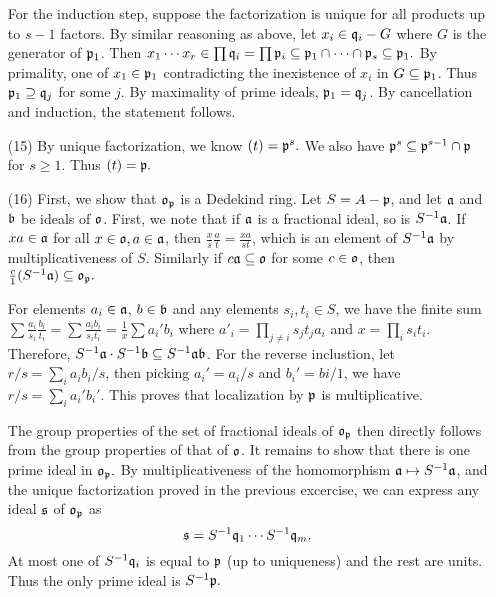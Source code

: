 \documentclass{article}
\theoremstyle{definition}
\theoremstyle{remark}
\begin{document}
\begin{enumerate}
        \newcommand{\inv}[1]{#1^{-1}}
        For the induction step, suppose the factorization is unique for all products up to $s - 1$ factors. By similar reasoning as above, let $x_i \in \mathfrak{q}_i - G$ where $G$ is the generator of $\mathfrak{p}_1$. Then $x_1 \cdots x_r \in \prod \mathfrak{q}_i =  \prod \mathfrak{p}_i \subseteq \mathfrak{p}_1 \cap \cdots \cap \mathfrak{p}_s \subseteq \mathfrak{p}_1.$ By primality, one of $x_1 \in \mathfrak{p}_1$ contradicting the inexistence of $x_i$ in $G \subseteq \mathfrak{p}_1$. Thus $\mathfrak{p}_1 \supseteq \mathfrak{q}_j$ for some $j$. By maximality of prime ideals, $\mathfrak{p}_1 = \mathfrak{q}_j$. By cancellation and induction, the statement follows.
  \item[(15)] By unique factorization, we know $(t)=  \mathfrak{p}^s.$ We also have $\mathfrak{p}^{s} \subseteq \mathfrak{p}^{s-1} \cap \mathfrak{p}$ for  $s \geq 1.$ Thus $(t) = \mathfrak{p}.$

\newcommand{\ploc}[1]{#1_{\ip}}
  \item[(16)] First, we show that $\ploc{\io}$ is a Dedekind ring. Let $S = A - \mathfrak{p}$, and let $\mathfrak{a}$ and $\mathfrak{b}$ be ideals of $\mathfrak{o}$. First, we note that if $\mathfrak{a}$ is a fractional ideal, so is ${S}^{-1}\mathfrak{a}$. If $xa \in \mathfrak{a}$ for all $x \in \mathfrak{o}, a \in \mathfrak{a}$, then $\frac{x}s \frac{a}t = \frac{xa}{st}$, which is an element of ${S}^{-1}\mathfrak{a}$ by multiplicativeness of $S$. Similarly if $c\mathfrak{a} \subseteq \mathfrak{o}$ for some $c \in \mathfrak{o}$, then $\frac{c}1 (\localize{S}{\I a}) \subseteq \ploc{\io}.$

        For elements $a_i \in \mathfrak{a}$, $b \in \mathfrak{b}$ and any elements $s_i, t_i \in S$, we have the finite sum $\sum \frac{a_i}{s_i}\frac{b_i}{t_i} = \sum \frac{a_ib_i}{s_it_i} = \frac{1}{x}\sum{a_i'b_i}$ where $a'_i = \prod_{j \neq i}s_jt_ja_i$  and $x = \prod_{i}s_it_i$. Therefore, ${S}^{-1}\mathfrak{a}\cdot {S}^{-1}\mathfrak{b} \subseteq {S}^{-1}\mathfrak{a}\mathfrak{b}$. For the reverse inclustion, let $r/s = \sum_i a_ib_i /s$, then picking $a_i' = a_i/s$ and $b_i' = bi/1$, we have $r/s = \sum_i a_i'b_i'$. This proves that localization by $\mathfrak{p}$ is multiplicative.

        The group properties of the set of fractional ideals of $\ploc{\io}$ then directly follows from the group properties of that of $\mathfrak{o}$. It remains to show that there is one prime ideal in $\ploc{\io}.$ By multiplicativeness of the homomorphism $\mathfrak{a} \mapsto {S}^{-1}\mathfrak{a}$, and the unique factorization proved in the previous excercise, we can express any ideal $\mathfrak{s}$ of $\ploc{\io}$ as
        $$\mathfrak{s} = {S}^{-1}\mathfrak{q}_1 \cdots {S}^{-1}\mathfrak{q}_m.$$
        At most one of ${S}^{-1}\mathfrak{q}_i$ is equal to $\mathfrak{p}$ (up to uniqueness) and the rest are units. Thus the only prime ideal is ${S}^{-1}\mathfrak{p}.$


\end{enumerate}
\end{document}
